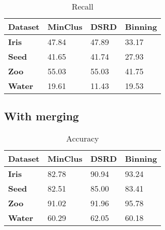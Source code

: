 \begin{table}[H]
\caption{Recall} 
\begin{center}
		\begin{tabular}{ | l | l | l | l |}
				\hline

				\textbf{Dataset} & \textbf{MinClus} & \textbf{DSRD} & \textbf{Binning} \\ \hline

                \textbf{Iris} &  47.84 & 47.89 & 33.17 \\ \hline
                \textbf{Seed} & 41.65 & 41.74 & 27.93 \\ \hline
                \textbf{Zoo} & 55.03 & 55.03 & 41.75  \\ \hline
                \textbf{Water} & 19.61 & 11.43 & 19.53 \\ \hline
		\end{tabular}
\end{center}
\label{table:rec1}
\end{table}

\subsection{With merging}

\begin{table}[H]
\caption{Accuracy} 
\begin{center}
		\begin{tabular}{ | l | l | l | l |}
				\hline

				\textbf{Dataset} & \textbf{MinClus} & \textbf{DSRD} & \textbf{Binning} \\ \hline
                \textbf{Iris} & 82.78 & 90.94 & 93.24 \\ \hline
                \textbf{Seed} & 82.51 & 85.00 & 83.41 \\ \hline
                \textbf{Zoo} & 91.02 & 91.96 & 95.78  \\ \hline
                \textbf{Water} & 60.29 & 62.05 & 60.18  \\ \hline
		\end{tabular}
\end{center}
\label{table:acc2}
\end{table}



